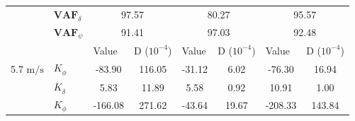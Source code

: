 \begin{table}[]
\begin{tabular}{llcccccc}
                                 & $\mathbf{VAF}_\delta$ & \multicolumn{2}{c}{97.57}                                                                       & \multicolumn{2}{c}{80.27}                                                                       & \multicolumn{2}{c}{95.57}                                                                       \\
                                 & $\mathbf{VAF}_\psi$   & \multicolumn{2}{c}{91.41}                                                                       & \multicolumn{2}{c}{97.03}                                                                       & \multicolumn{2}{c}{92.48}                                                                       \\ \hline
                                 &                       & \multicolumn{1}{l}{\multirow{2}{*}{Value}} & \multicolumn{1}{l}{\multirow{2}{*}{D ($10^{-4}$)}} & \multicolumn{1}{l}{\multirow{2}{*}{Value}} & \multicolumn{1}{l}{\multirow{2}{*}{D ($10^{-4}$)}} & \multicolumn{1}{l}{\multirow{2}{*}{Value}} & \multicolumn{1}{l}{\multirow{2}{*}{D ($10^{-4}$)}} \\
                                 &                       & \multicolumn{1}{l}{}                       & \multicolumn{1}{l}{}                               & \multicolumn{1}{l}{}                       & \multicolumn{1}{l}{}                               & \multicolumn{1}{l}{}                       & \multicolumn{1}{l}{}                               \\ \cline{3-8} 
    5.7 $\si{\meter\per\second}$ & $K_{\dot{\phi}} $     & -83.90                                     & 116.05                                             & -31.12                                     & 6.02                                               & -76.30                                     & 16.94                                              \\
                                 & $K_{\dot{\delta}}$    & 5.83                                       & 11.89                                              & 5.58                                       & 0.92                                               & 10.91                                      & 1.00                                               \\
                                 & $K_{\phi} $           & -166.08                                    & 271.62                                             & -43.64                                     & 19.67                                              & -208.33                                    & 143.84                                             \\

\end{tabular}
\end{table}
